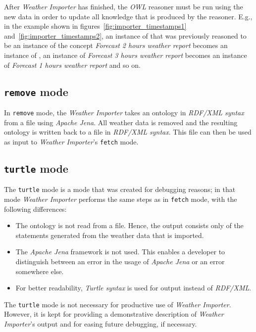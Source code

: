 After \emph{Weather Importer} has finished, the \emph{OWL} reasoner must be run using the new data in order to update all knowledge that is produced by the reasoner. E.g., in the example shown in figures~\ref{fig:importer_timestamps1} and~\ref{fig:importer_timestamps2}, an instance of  that was previously reasoned to be an instance of the concept \emph{Forecast 2 hours weather report} becomes an instance of , an instance of \emph{Forecast 3 hours weather report} becomes an instance of \emph{Forecast 1 hours weather report} and so on.

\subsection{\texttt{remove} mode}

In \texttt{remove} mode, the \emph{Weather Importer} takes an ontology in \emph{RDF/XML syntax} from a file using \emph{Apache Jena}. All weather data is removed and the resulting ontology is written back to a file in \emph{RDF/XML syntax}. This file can then be used as input to \emph{Weather Importer}'s \texttt{fetch} mode.

\subsection{\texttt{turtle} mode}
\label{subsec:importer_turtle}

The \texttt{turtle} mode is a mode that was created for debugging reasons; in that mode \emph{Weather Importer} performs the same steps as in \texttt{fetch} mode, with the following differences:
\begin{itemize}
  \item The \smarthomeweather ontology is not read from a file. Hence, the output consists only of the statements generated from the weather data that is imported.
  \item The \emph{Apache Jena} framework is not used. This enables a developer to distinguish between an error in the usage of \emph{Apache Jena} or an error somewhere else.
  \item For better readability, \emph{Turtle syntax} is used for output instead of \emph{RDF/XML}.
\end{itemize}

The \texttt{turtle} mode is not necessary for productive use of \emph{Weather Importer}. However, it is kept for providing a demonstrative description of \emph{Weather Importer}'s output and for easing future debugging, if necessary.

